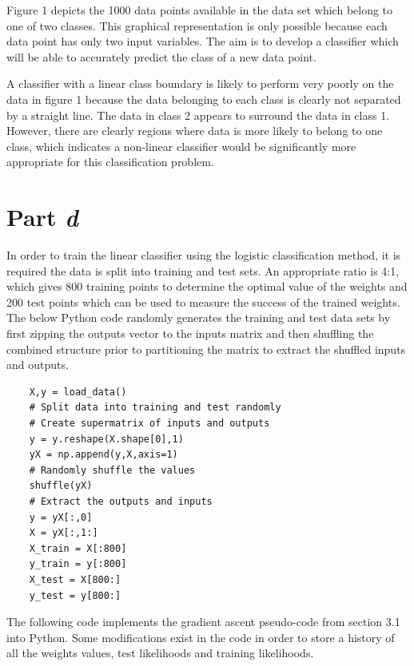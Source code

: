 \documentclass[twocolumn]{article}
\begin{document}
Figure 1 depicts the 1000 data points available in the data set which belong to one of two classes. This graphical representation is only possible because each data point has only two input variables. The aim is to develop a classifier which will be able to accurately predict the class of a new data point.

A classifier with a linear class boundary is likely to perform very poorly on the data in figure 1 because the data belonging to each class is clearly not separated by a straight line. The data in class 2 appears to surround the data in class 1. However, there are clearly regions where data is more likely to belong to one class, which indicates a non-linear classifier would be significantly more appropriate for this classification problem.

\section{Part \textit{d}}

In order to train the linear classifier using the logistic classification method, it is required the data is split into training and test sets. An appropriate ratio is 4:1, which gives 800 training points to determine the optimal value of the weights and 200 test points which can be used to measure the success of the trained weights. The below Python code randomly generates the training and test data sets by first zipping the outputs vector to the inputs matrix and then shuffling the combined structure prior to partitioning the matrix to extract the shuffled inputs and outputs. 

\begin{verbatim}
    X,y = load_data()
    # Split data into training and test randomly
    # Create supermatrix of inputs and outputs
    y = y.reshape(X.shape[0],1) 
    yX = np.append(y,X,axis=1)
    # Randomly shuffle the values
    shuffle(yX)
    # Extract the outputs and inputs
    y = yX[:,0]
    X = yX[:,1:]
    X_train = X[:800]
    y_train = y[:800]
    X_test = X[800:]
    y_test = y[800:]
\end{verbatim}

The following code implements the gradient ascent pseudo-code from section 3.1 into Python. Some modifications exist in the code in order to store a history of all the weights values, test likelihoods and training likelihoods.
\end{document}
